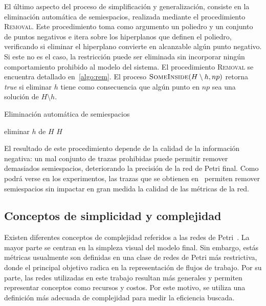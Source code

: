 El último aspecto del proceso de simplificación y generalización,
consiste en la eliminación automática  de semiespacios,
realizada mediante el procedimiento \textsc{Removal}.
Este procedimiento toma como argumento un poliedro y un conjunto de puntos
negativos e itera sobre los hiperplanos que definen el poliedro,
verificando si eliminar el hiperplano convierte en alcanzable algún punto negativo.
Si este no es el caso, la restricción puede ser eliminada sin incorporar
ningún comportamiento prohibido al modelo del sistema. El procedimiento \textsc{Removal}
se encuentra detallado en~\autoref{algo:rem}. El proceso $\textsc{SomeInside}(H \setminus h, np)$
retorna \textit{true} si eliminar $h$ tiene como consecuencia que algún punto en $np$
sea una solución de $H \setminus {h}$.

\begin{algorithm}[h]
\caption{Eliminación automática de semiespacios}
    \begin{algorithmic}[1]
                    \State eliminar $h$ de $H$
                \EndIf
            \EndFor
            \State \Return $H$
        \EndProcedure
    \end{algorithmic}
    \label{algo:rem}
\end{algorithm}

El resultado de este procedimiento depende de la calidad de la información negativa:
un mal conjunto de trazas prohibidas puede permitir remover demasiados semiespacios,
deteriorando la precisión de la red de Petri final. Como podrá verse en los experimentos,
las trazas que se obtienen en~\cite{BrouckeWVB14} permiten remover semiespacios sin 
impactar en gran medida la calidad de las métricas de la red.

\subsection{Conceptos de simplicidad y complejidad}
\label{sec:3.complexity}

Existen diferentes conceptos de complejidad referidos a las redes de Petri~\cite{Lassen08,Mendling2007}. 
La mayor parte se centran en la simpleza visual del modelo final. Sin embargo, estás métricas usualmente 
son definidas en una clase de redes de Petri más restrictiva, donde el principal objetivo radica en la 
representación de flujos de trabajo. Por su parte, las redes utilizadas en este trabajo resultan más generales
y permiten representar conceptos como recursos y costos. Por este motivo, se utiliza una definición más adecuada
de complejidad para medir la eficiencia buscada.

